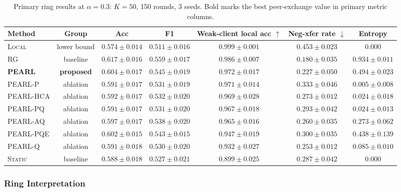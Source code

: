 \documentclass[conference]{IEEEtran}
\begin{document}
\begin{table}[t]
\centering
\caption{Primary ring results at $\alpha=0.3$: $K=50$, 150 rounds, 3 seeds. Bold marks the best peer-exchange value in primary metric columns.}
\label{tab:ring_results}
\renewcommand{\arraystretch}{1.18}
\setlength{\tabcolsep}{4pt}
\begin{tabular}{lcccccc}
\toprule
\textbf{Method} & \textbf{Group} & \textbf{Acc} & \textbf{F1} & \textbf{Weak-client local acc} $\uparrow$ & \textbf{Neg-xfer rate} $\downarrow$ & \textbf{Entropy} \\
\midrule
\textsc{Local}                     & lower bound & $0.574\pm0.014$ & $0.511\pm0.016$ & $0.999\pm0.001$ & $0.453\pm0.023$ & $0.000$ \\
\textsc{RG}                    & baseline    & $0.617\pm0.016$ & $0.559\pm0.017$ & $0.986\pm0.007$ & $0.180\pm0.035$ & $0.934\pm0.011$ \\
\textbf{\textsc{PEARL}}            & \textbf{proposed} & $0.604\pm0.017$ & $0.545\pm0.019$ & $\mathbf{0.972\pm0.017}$ & $0.227\pm0.050$ & $\mathbf{0.494\pm0.023}$ \\
\textsc{PEARL-P}                 & ablation    & $0.591\pm0.017$ & $0.531\pm0.019$ & $0.971\pm0.014$ & $0.333\pm0.046$ & $0.005\pm0.008$ \\
\textsc{PEARL-HCA}          & ablation    & $0.592\pm0.017$ & $0.532\pm0.020$ & $0.969\pm0.028$ & $0.273\pm0.012$ & $0.024\pm0.018$ \\
\textsc{PEARL-PQ}              & ablation    & $0.591\pm0.017$ & $0.531\pm0.020$ & $0.967\pm0.018$ & $0.293\pm0.042$ & $0.024\pm0.013$ \\
\textsc{PEARL-AQ}                 & ablation    & $0.597\pm0.017$ & $0.538\pm0.020$ & $0.965\pm0.016$ & $0.260\pm0.035$ & $0.273\pm0.062$ \\
\textsc{PEARL-PQE} & ablation    & $0.602\pm0.015$ & $0.543\pm0.015$ & $0.947\pm0.019$ & $0.300\pm0.035$ & $0.438\pm0.139$ \\
\textsc{PEARL-Q}                   & ablation    & $0.591\pm0.018$ & $0.530\pm0.020$ & $0.932\pm0.027$ & $0.253\pm0.012$ & $0.085\pm0.010$ \\
\textsc{Static}                    & baseline    & $0.588\pm0.018$ & $0.527\pm0.021$ & $0.899\pm0.025$ & $0.287\pm0.042$ & $0.000$ \\
\bottomrule
\end{tabular}
\end{table}

\subsubsection{Ring Interpretation}
\label{subsubsec:ring-neg-transfer}
\end{document}
